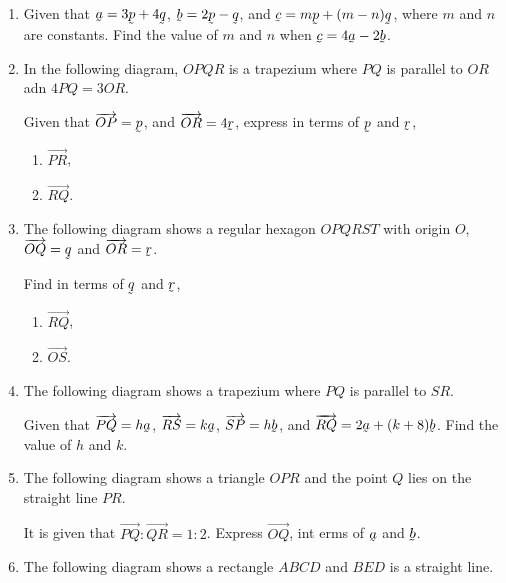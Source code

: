 \documentclass{report}
\renewcommand{\vec}[1]{\underaccent{\tilde}{#1}}
\begin{document}
\begin{multicols*}{2}
\begin{enumerate}
        \item Given that $\vec{a} = 3\vec{p} + 4\vec{q}$, $\vec{b} = 2\vec{p} - \vec{q}$, and
              $\vec{c} = m\vec{p} + (m-n)\vec{q}$, where $m$ and $n$ are constants. Find the
              value of $m$ and $n$ when $\vec{c} = 4\vec{a} - 2\vec{b}$.

        \item In the following diagram, $OPQR$ is a trapezium where $PQ$ is parallel to $OR$
              adn $4PQ = 3OR$.

              Given that $\overrightarrow{OP} = \vec{p}$, and $\overrightarrow{OR} =
                  4\vec{r}$, express in terms of $\vec{p}$ and $\vec{r}$,
              \begin{enumerate}
                  \item $\overrightarrow{PR}$,
                  \item $\overrightarrow{RQ}$.
              \end{enumerate}

        \item The following diagram shows a regular hexagon $OPQRST$ with origin $O$,
              $\overrightarrow{OQ} = \vec{q}$ and $\overrightarrow{OR} = \vec{r}$.

              Find in terms of $\vec{q}$ and $\vec{r}$,
              \begin{enumerate}
                  \item $\overrightarrow{RQ}$,
                  \item $\overrightarrow{OS}$.
              \end{enumerate}

        \item The following diagram shows a trapezium where $PQ$ is parallel to $SR$.

              Given that $\overrightarrow{PQ} = h\vec{a}$, $\overrightarrow{RS} = k\vec{a}$,
              $\overrightarrow{SP} = h\vec{b}$, and $\overrightarrow{RQ} = 2\vec{a} +
                  (k+8)\vec{b}$. Find the value of $h$ and $k$.

        \item The following diagram shows a triangle $OPR$ and the point $Q$ lies on the
              straight line $PR$.

              It is given that $\overrightarrow{PQ}:\overrightarrow{QR} = 1:2$. Express
              $\overrightarrow{OQ}$, int erms of $\vec{a}$ and $\vec{b}$.

        \item The following diagram shows a rectangle $ABCD$ and $BED$ is a straight line.


\end{enumerate}
\end{multicols*}
\end{document}
